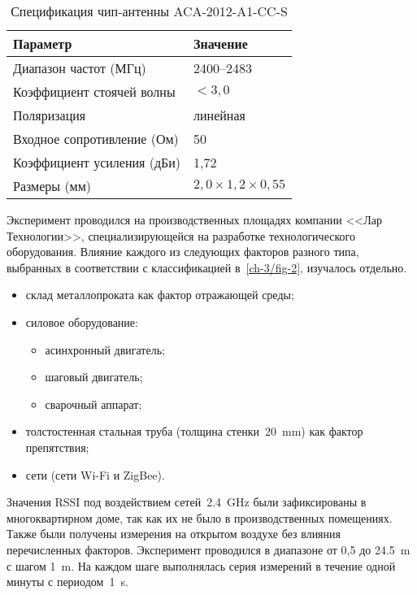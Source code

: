 \begin{table}[ht]
\centering
\caption{Спецификация чип-антенны ACA-2012-A1-CC-S} \vspace{4pt}
\label{tab-1}
	\begin{tabularx}{\linewidth}{XX}
		\toprule
		\textbf{Параметр} & \textbf{Значение} \\
		\midrule
		Диапазон частот (МГц) & 2400--2483 \\
		Коэффициент стоячей волны &$<3,0$\\
		Поляризация & линейная \\
		Входное сопротивление (Ом) & 50 \\
		Коэффициент усиления (дБи) & 1,72 \\
		Размеры (мм) & $2,0 \times1,2 \times0,55$\\
		\bottomrule
	\end{tabularx}
\end{table}

Эксперимент проводился на производственных площадях компании <<Лар Технологии>>, специализирующейся на разработке технологического оборудования. Влияние каждого из следующих факторов разного типа, выбранных в соответствии с классификацией в~\cref{ch-3/fig-2}, изучалось отдельно.

\begin{itemize}
\item склад металлопроката как фактор отражающей среды;
\item силовое оборудование:
	\begin{itemize}
		\item асинхронный двигатель;
		\item шаговый двигатель;
		\item сварочный аппарат;
	\end{itemize}
\item толстостенная стальная труба (толщина стенки~\SI{20}{\milli\meter}) как фактор препятствия;
\item сети (сети Wi-Fi и ZigBee).
\end{itemize}

Значения RSSI под воздействием сетей~\SI{2,4}{\giga\hertz} были зафиксированы в многоквартирном доме, так как их не было в производственных помещениях. Также были получены измерения на открытом воздухе без влияния перечисленных факторов. Эксперимент проводился в диапазоне от 0,5 до \SI{24,5}{\meter} с шагом \SI{1}{\meter}. На каждом шаге выполнялась серия измерений в течение одной минуты с периодом~\SI{1}{\second}.

